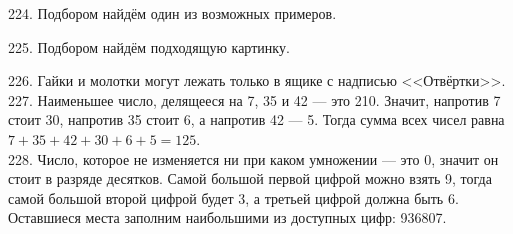 \documentclass[12pt]{article}
\begin{document}
224. Подбором найдём один из возможных примеров.
\begin{center}
\begin{figure}[ht!]
\end{figure}
\end{center}
225. Подбором найдём подходящую картинку.
\begin{center}
\begin{figure}[ht!]
\end{figure}
\end{center}
226. Гайки и молотки могут лежать только в ящике с надписью <<Отвёртки>>.\\
227. Наименьшее число, делящееся на 7, 35 и 42 --- это 210. Значит, напротив 7 стоит 30, напротив 35 стоит 6, а напротив 42 --- 5. Тогда сумма всех чисел равна $7+35+42+30+6+5=125.$\\
228. Число, которое не изменяется ни при каком умножении --- это 0, значит он стоит в разряде десятков. Самой большой первой цифрой можно взять 9, тогда самой большой второй цифрой будет 3, а третьей цифрой должна быть 6. Оставшиеся места заполним наибольшими из доступных цифр: 936807.\\
\end{document}
